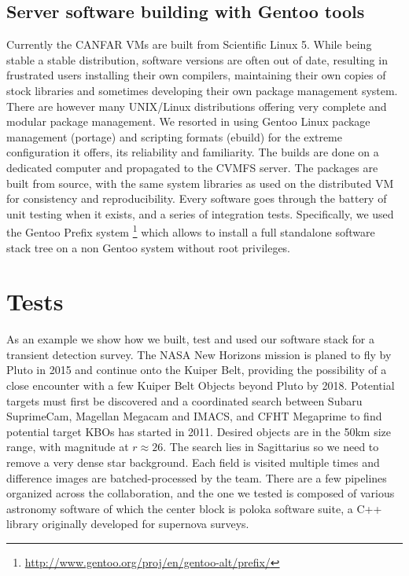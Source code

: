 \documentclass[11pt,twoside]{article}
\begin{document}
\subsection{Server software building with Gentoo tools}
Currently the CANFAR VMs are built from
Scientific Linux 5. While being stable a stable distribution, software versions
are often out of date, resulting in frustrated users installing their own
compilers, maintaining their own copies of stock libraries and
sometimes developing their own package management system. There are however many UNIX/Linux distributions offering
very complete and modular package management. We resorted in
using Gentoo Linux package management (portage) and scripting formats
(ebuild) for the extreme configuration it offers, its reliability and
familiarity. The builds are done on a dedicated computer and propagated to the CVMFS
server. The packages are built from source, with the same system libraries as used on the
distributed VM for consistency and reproducibility. Every software
goes through the battery of unit testing when it exists, and a series
of integration tests. Specifically, we used the Gentoo Prefix system \footnote{\url{http://www.gentoo.org/proj/en/gentoo-alt/prefix/}}
which allows to install a full standalone software stack tree on a non
Gentoo system without root privileges.


\section{Tests}

As an example we show how we built, test and used our software stack
for a transient detection survey.
The NASA New Horizons mission is planed to fly by Pluto in 2015 and
continue onto the Kuiper Belt, providing the possibility of a close
encounter with a few Kuiper Belt Objects beyond Pluto by
2018. Potential targets must first be discovered and a coordinated
search between Subaru SuprimeCam, Magellan Megacam and IMACS, and CFHT
Megaprime to find potential target KBOs has started in 2011. Desired objects
are in the 50km size range, with magnitude at $r\approx 26$. The search lies in
Sagittarius so we need to remove a very dense star background. Each
field is visited multiple times and difference images are
batched-processed by the team. There are a few
pipelines organized across the collaboration, and the one we tested is
composed of various astronomy software of which the center block is poloka software suite, a C++
library originally developed for supernova surveys.
\end{document}
